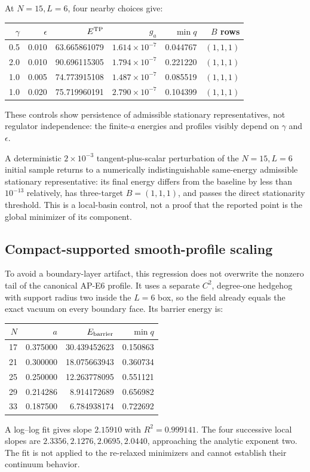 \documentclass[11pt]{article}
\numberwithin{equation}{section}
\theoremstyle{definition}
\theoremstyle{remark}
\begin{document}
At \(N=15,L=6\), four nearby choices give:
\begin{center}
\small
\begin{tabular}{rrrrrr}
\toprule
\(\gamma\)&\(\epsilon\)&\(E^{\rm TP}\)&\(g_a\)&\(\min q\)&\(B\) rows\\
\midrule
0.5&0.010&63.665861079&\(1.614\!\times10^{-7}\)&0.044767&\((1,1,1)\)\\
2.0&0.010&90.696115305&\(1.794\!\times10^{-7}\)&0.221220&\((1,1,1)\)\\
1.0&0.005&74.773915108&\(1.487\!\times10^{-7}\)&0.085519&\((1,1,1)\)\\
1.0&0.020&75.719960191&\(2.790\!\times10^{-7}\)&0.104399&\((1,1,1)\)\\
\bottomrule
\end{tabular}
\end{center}
These controls show persistence of admissible stationary representatives, not
regulator independence: the finite-\(a\) energies and profiles visibly depend
on \(\gamma\) and \(\epsilon\).

A deterministic \(2\times10^{-3}\) tangent-plus-scalar perturbation of the
\(N=15,L=6\) initial sample returns to a numerically indistinguishable
same-energy admissible stationary representative: its final energy
differs from the baseline by less than \(10^{-13}\) relatively, has
three-target \(B=(1,1,1)\), and passes the direct stationarity threshold.
This is a local-basin control, not a proof that the reported point is the
global minimizer of its component.

\subsection{Compact-supported smooth-profile scaling}

To avoid a boundary-layer artifact, this regression does not overwrite the
nonzero tail of the canonical AP-E6 profile.  It uses a separate \(C^2\),
degree-one hedgehog with support radius two inside the \(L=6\) box, so the
field already equals the exact vacuum on every boundary face.  Its barrier
energy is:
\begin{center}
\small
\begin{tabular}{rrrr}
\toprule
\(N\)&\(a\)&\(E_{\rm barrier}\)&\(\min q\)\\
\midrule
17&0.375000&30.439452623&0.150863\\
21&0.300000&18.075663943&0.360734\\
25&0.250000&12.263778095&0.551121\\
29&0.214286&8.914172689&0.656982\\
33&0.187500&6.784938174&0.722692\\
\bottomrule
\end{tabular}
\end{center}
A log--log fit gives slope \(2.15910\) with \(R^2=0.999141\).  The four
successive local slopes are \(2.3356,2.1276,2.0695,2.0440\), approaching the
analytic exponent two.  The fit is not applied to the re-relaxed minimizers
and cannot establish their continuum behavior.
\end{document}
